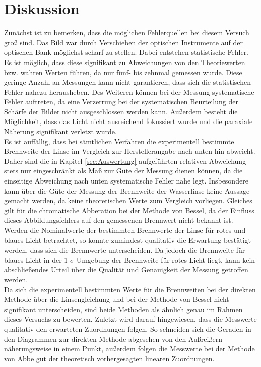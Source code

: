 \section{Diskussion}
\label{sec:Diskussion}
Zunächst ist zu bemerken, dass die möglichen Fehlerquellen bei diesem Versuch groß sind.
Das Bild war durch Verschieben der optischen Instrumente auf der optischen Bank möglichst
scharf zu stellen. Dabei entstehen statistische Fehler. Es ist möglich, dass diese
signifikant zu Abweichungen von den Theoriewerten bzw. wahren Werten führen, da nur fünf-
bis zehnmal gemessen wurde. Diese geringe Anzahl an Messungen kann nicht
garantieren, dass sich die statistischen Fehler nahezu herausheben. Des Weiteren können
bei der Messung systematische Fehler auftreten, da eine Verzerrung bei der systematischen
Beurteilung der Schärfe der Bilder nicht ausgeschlossen werden kann. Außerdem besteht die
Möglichkeit, dass das Licht nicht ausreichend fokussiert wurde und die paraxiale Näherung
signifikant verletzt wurde.\\
Es ist auffällig, dass bei sämtlichen Verfahren die experimentell bestimmte Brennweite der Linse im Vergleich
zur Herstellerangabe nach unten hin abweicht. Daher sind die in Kapitel \ref{sec:Auswertung}
aufgeführten relativen Abweichung stets nur eingeschränkt als Maß zur Güte der Messung
dienen können, da die einseitige Abweichung nach unten systematische Fehler nahe legt.
Insbesondere kann über die Güte der Messung der Brennweite der Wasserlinse keine
Aussage gemacht werden, da keine theoretischen Werte zum Vergleich vorliegen.
Gleiches gilt für die chromatische Abberation bei der Methode von Bessel, da der Einfluss
dieses Abbildungsfehlers auf den gemessenen Brennwert nicht bekannt ist. Werden
die Nominalwerte der bestimmten Brennwerte der Linse für rotes und blaues Licht betrachtet,
so konnte zumindest qualitativ die Erwartung bestätigt werden, dass sich die Brennwerte
unterscheiden. Da jedoch die Brennweite für blaues Licht in der 1-$\sigma$-Umgebung
der Brennweite für rotes Licht liegt, kann kein abschließendes Urteil über die
Qualität und Genauigkeit der Messung getroffen werden. \\
Da sich die experimentell bestimmten Werte für die Brennweiten bei der direkten Methode
über die Linsengleichung und bei der Methode von Bessel nicht signifikant unterscheiden,
sind beide Methoden als ähnlich genau im Rahmen dieses Versuchs zu bewerten.
Zuletzt wird darauf hingewiesen, dass die Messwerte qualitativ den erwarteten Zuordnungen
folgen. So schneiden sich die Geraden in den Diagrammen zur direkten Methode abgesehen
von den Außreißern näherungsweise in einem Punkt, außerdem folgen die Messwerte bei der
Methode von Abbe gut der theoretisch vorhergesagten linearen Zuordnungen.
